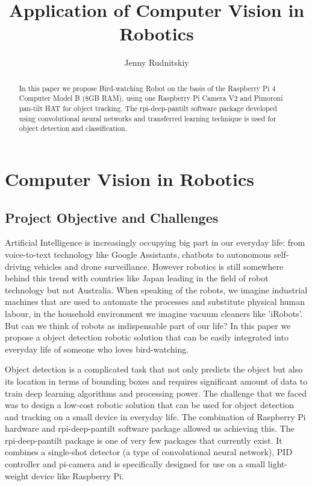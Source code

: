 \documentclass[runningheads]{llncs}
\begin{document}
%
\title{Application of Computer Vision in Robotics}
%
%
\author{Jenny Rudnitskiy}
%
%
%
\maketitle              %
%
\begin{abstract}
In this paper we propose Bird-watching Robot on the basis of the Raspberry Pi 4 Computer Model B (8GB RAM), using one Raspberry Pi Camera V2 and Pimoroni pan-tilt HAT for object tracking. The rpi-deep-pantilt software package developed using convolutional neural networks and transferred learning technique is used for object detection and classification.  


\end{abstract}
%
%
%
\section{Computer Vision in Robotics}
\subsection{Project Objective and Challenges}
\setlength{\parskip}{1em}
Artificial Intelligence is increasingly occupying big part in our everyday life: from voice-to-text technology like Google Assistants, chatbots to autonomous self-driving vehicles and drone surveillance. However robotics is still somewhere behind this trend with countries like Japan leading in the field of robot technology but not Australia. When speaking of the robots, we imagine industrial machines that are used to automate the processes and substitute physical human labour, in the household environment we imagine vacuum cleaners like 'iRobots'. But can we think of robots as indispensable part of our life? In this paper we propose a object detection robotic solution that can be easily integrated into everyday life of someone who loves bird-watching.

Object detection is a complicated task that not only predicts the object but also its location in terms of bounding boxes and requires significant amount of data to train deep learning algorithms and processing power. The challenge that we faced was to design a low-cost robotic solution that can be used for object detection and tracking on a small device in everyday life. The combination of Raspberry Pi hardware and rpi-deep-pantilt software package allowed us achieving this. The rpi-deep-pantilt package is one of very few packages that currently exist. It combines a single-shot detector (a type of convolutional neural network), PID controller and pi-camera  and is specifically designed for use on a small light-weight device like Raspberry Pi. 
\end{document}
